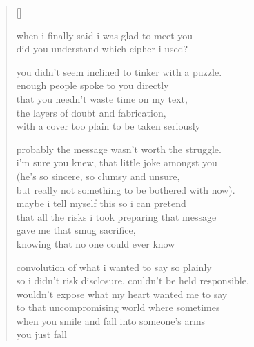 
\settowidth{}
\begin{verse}[\versewidth]

when i finally said i was glad to meet you  \\
did you understand which cipher i used?

you didn't seem inclined to tinker with a puzzle. \\
enough people spoke to you directly \\
that you needn't waste time on my text, \\
the layers of doubt and fabrication, \\
with a cover too plain to be taken seriously 

probably the message wasn't worth the struggle. \\
i'm sure you knew, that little joke amongst you \\
(he's so sincere, so clumsy and unsure, \\
but really not something to be bothered with now). \\
maybe i tell myself this so i can pretend \\
that all the risks i took preparing that message \\
gave me that smug sacrifice,  \\
knowing that no one could ever know 

convolution of what i wanted to say so plainly \\
so i didn't risk disclosure, couldn't be held responsible, \\
wouldn't expose what my heart wanted me to say \\
to that uncompromising world where sometimes \\
when you smile and fall into someone's arms \\
you just fall
\end{verse}
